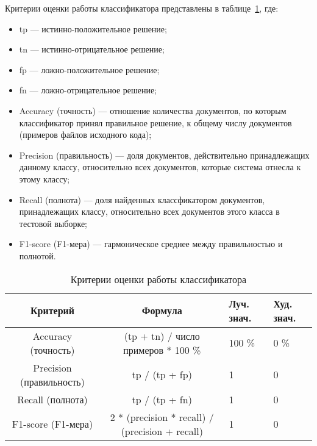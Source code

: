Критерии оценки работы классификатора представлены в таблице~\ref{tab:eval}, где:
\begin{itemize}
  \item tp --- истинно-положительное решение;
  \item tn --- истинно-отрицательное решение;
  \item fp --- ложно-положительное решение;
  \item fn --- ложно-отрицательное решение;
  \item Accuracy (точность) --- отношение количества документов, по которым классификатор принял правильное решение, к общему числу документов (примеров файлов исходного кода); 
  \item Precision (правильность) --- доля документов, действительно принадлежащих данному классу, относительно всех документов, которые система отнесла к этому классу;
  \item Recall (полнота) --- доля найденных классфикатором документов, принадлежащих классу, относительно всех документов этого класса в тестовой выборке;
  \item F1-score (F1-мера) --- гармоническое среднее между правильностью и полнотой.~\cite{metrics}
\end{itemize}

\begin{table}[h!]
\caption{ Критерии оценки работы классификатора }
\label{tab:eval}
\begin{center}
\begin{tabularx}{\linewidth}{|c|c|X|X|}
\hline
Критерий & Формула & Луч. знач. & Худ. знач. \\
\hline
Accuracy (точность) & (tp + tn) / число примеров * 100 \% & 100 \% & 0 \% \\
\hline
Precision (правильность) & tp / (tp + fp) & 1 & 0 \\
\hline
Recall (полнота) & tp / (tp + fn) & 1 & 0 \\
\hline
F1-score (F1-мера) & 2 * (precision * recall) / (precision + recall) & 1 & 0 \\
\hline
\end{tabularx}
\end{center}
\end{table}
